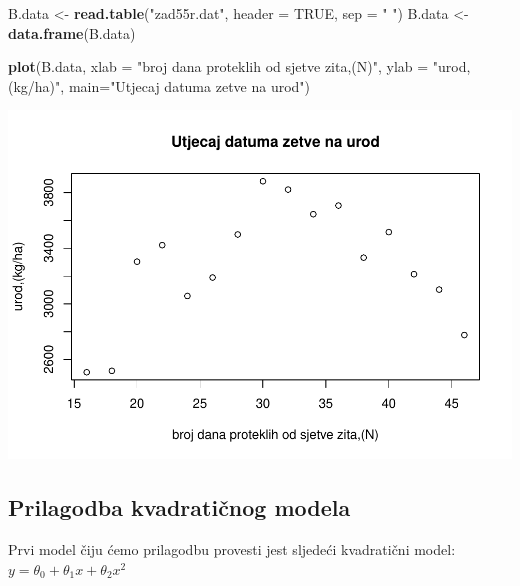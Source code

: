 \documentclass[]{article}
\newenvironment{Shaded}{\begin{snugshade}}{\end{snugshade}}
\newcommand{\KeywordTok}[1]{\textcolor[rgb]{0.13,0.29,0.53}{\textbf{{#1}}}}
\newcommand{\DataTypeTok}[1]{\textcolor[rgb]{0.13,0.29,0.53}{{#1}}}
\newcommand{\DecValTok}[1]{\textcolor[rgb]{0.00,0.00,0.81}{{#1}}}
\newcommand{\StringTok}[1]{\textcolor[rgb]{0.31,0.60,0.02}{{#1}}}
\newcommand{\OtherTok}[1]{\textcolor[rgb]{0.56,0.35,0.01}{{#1}}}
\newcommand{\NormalTok}[1]{{#1}}
\begin{document}
\begin{Shaded}
\begin{Highlighting}[]
\NormalTok{B.data <-}\StringTok{ }\KeywordTok{read.table}\NormalTok{(}\StringTok{"zad55r.dat"}\NormalTok{, }\DataTypeTok{header =} \OtherTok{TRUE}\NormalTok{, }\DataTypeTok{sep =} \StringTok{" "}\NormalTok{)}
\NormalTok{B.data <-}\StringTok{ }\KeywordTok{data.frame}\NormalTok{(B.data)}

\KeywordTok{plot}\NormalTok{(B.data, }\DataTypeTok{xlab =} \StringTok{"broj dana proteklih od sjetve zita,(N)"}\NormalTok{, }\DataTypeTok{ylab =} \StringTok{"urod,(kg/ha)"}\NormalTok{,}
     \DataTypeTok{main=}\StringTok{"Utjecaj datuma zetve na urod"}\NormalTok{)}
\end{Highlighting}
\end{Shaded}

\includegraphics{Izvjestaj_files/figure-latex/unnamed-chunk-16-1.pdf}

\subsection{Prilagodba kvadratičnog
modela}\label{prilagodba-kvadraticnog-modela-1}

Prvi model čiju ćemo prilagodbu provesti jest sljedeći kvadratični
model: \(y = \theta_0 + \theta_1 x + \theta_2 x^2\)

\begin{Shaded}
\end{Shaded}
\end{document}
